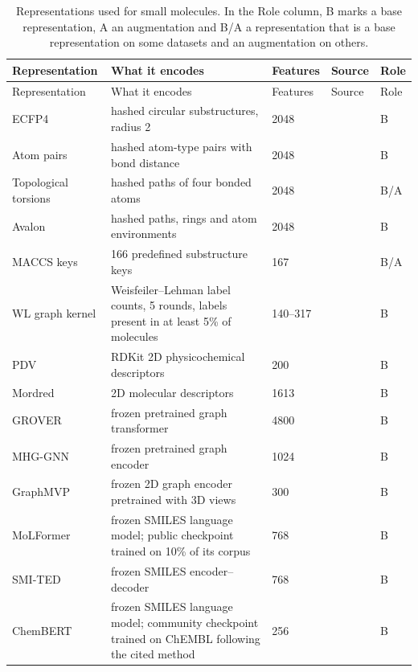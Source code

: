 {\let\small\footnotesize
\begin{longtable}{P{3.0cm}P{5.0cm}P{1.5cm}P{1.5cm}P{1.4cm}}
\caption[Representations used for small molecules.]{Representations used for small molecules. In the Role column, B marks a base representation, A an augmentation and B/A a representation that is a base representation on some datasets and an augmentation on others.}\label{tab:reps_smallmol}\\
\toprule
Representation & What it encodes & Features & Source & Role \\
\midrule
\endfirsthead
\toprule
Representation & What it encodes & Features & Source & Role \\
\midrule
\endhead
\bottomrule
\endfoot
ECFP4 & hashed circular substructures, radius 2 & 2048 & \citep{rogers2010} & B \\
Atom pairs & hashed atom-type pairs with bond distance & 2048 & \citep{Carhart1985} & B \\
Topological torsions & hashed paths of four bonded atoms & 2048 & \citep{Nilakantan1987} & B/A \\
Avalon & hashed paths, rings and atom environments & 2048 & \citep{Gedeck2006} & B \\
MACCS keys & 166 predefined substructure keys & 167 & \citep{Durant2002} & B/A \\
WL graph kernel & Weisfeiler--Lehman label counts, 5 rounds, labels present in at least 5\% of molecules & 140--317 & \citep{Shervashidze2011} & B \\
PDV & RDKit 2D physicochemical descriptors & 200 & \citep{rdkit} & B \\
Mordred & 2D molecular descriptors & 1613 & \citep{Moriwaki2018} & B \\
GROVER & frozen pretrained graph transformer & 4800 & \citep{Rong2020GROVER} & B \\
MHG-GNN & frozen pretrained graph encoder & 1024 & \citep{kishimoto2023} & B \\
GraphMVP & frozen 2D graph encoder pretrained with 3D views & 300 & \citep{Liu2022GraphMVP} & B \\
MoLFormer & frozen SMILES language model; public checkpoint trained on 10\% of its corpus & 768 & \citep{ross2022} & B \\
SMI-TED & frozen SMILES encoder--decoder & 768 & \citep{Soares2025} & B \\
ChemBERT & frozen SMILES language model; community checkpoint trained on ChEMBL following the cited method & 256 & \citep{Zhang2022ChemBERT} & B \\

\end{longtable}}
